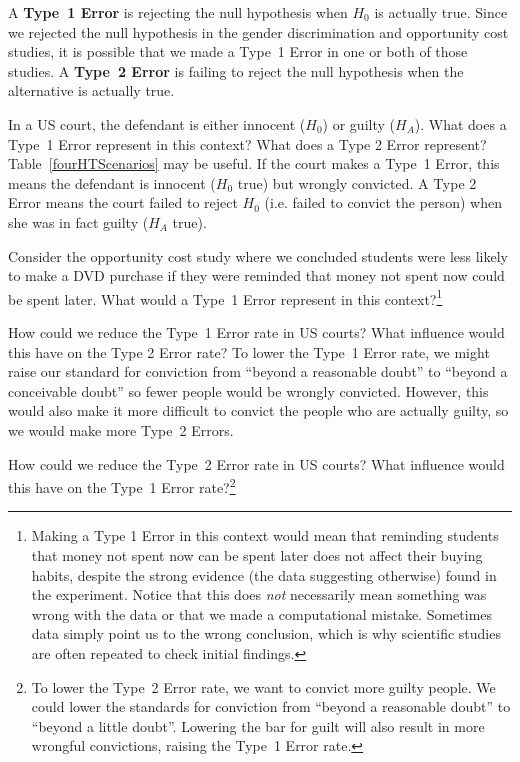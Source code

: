 A \textbf{Type~1 Error} is rejecting the null hypothesis when $H_0$ is actually true. Since we rejected the null hypothesis in the gender discrimination and opportunity cost studies, it is possible that we made a Type~1 Error in one or both of those studies. A \textbf{Type~2 Error} is failing to reject the null hypothesis when the alternative is actually true.

\begin{example}{In a US court, the defendant is either innocent ($H_0$) or  guilty ($H_A$). What does a Type~1 Error represent in this context? What does a Type 2 Error represent? Table~\ref{fourHTScenarios} may be useful.}
If the court makes a Type~1 Error, this means the defendant is innocent ($H_0$ true) but wrongly convicted. A Type 2 Error means the court failed to reject $H_0$ (i.e. failed to convict the person) when she was in fact guilty ($H_A$ true).
\end{example}

\begin{exercise}
Consider the opportunity cost study where we concluded students were less likely to make a DVD purchase if they were reminded that money not spent now could be spent later. What would a Type~1 Error represent in this context?\footnote{Making a Type 1 Error in this context would mean that reminding students that money not spent now can be spent later does not affect their buying habits, despite the strong evidence (the data suggesting otherwise) found in the experiment. Notice that this does \emph{not} necessarily mean something was wrong with the data or that we made a computational mistake. Sometimes data simply point us to the wrong conclusion, which is why scientific studies are often repeated to check initial findings.}
\end{exercise}

\begin{example}{How could we reduce the Type~1 Error rate in US courts? What influence would this have on the Type 2 Error rate?}
To lower the Type~1 Error rate, we might raise our standard for conviction from ``beyond a reasonable doubt'' to ``beyond a conceivable doubt'' so fewer people would be wrongly convicted. However, this would also make it more difficult to convict the people who are actually guilty, so we would make more Type~2 Errors.
\end{example}

\begin{exercise} \label{howToReduceType2ErrorsInUSCourts}
How could we reduce the Type~2 Error rate in US courts? What influence would this have on the Type~1 Error rate?\footnote{To lower the Type~2 Error rate, we want to convict more guilty people. We could lower the standards for conviction from ``beyond a reasonable doubt'' to ``beyond a little doubt''. Lowering the bar for guilt will also result in more wrongful convictions, raising the Type~1 Error rate.}
\end{exercise}

